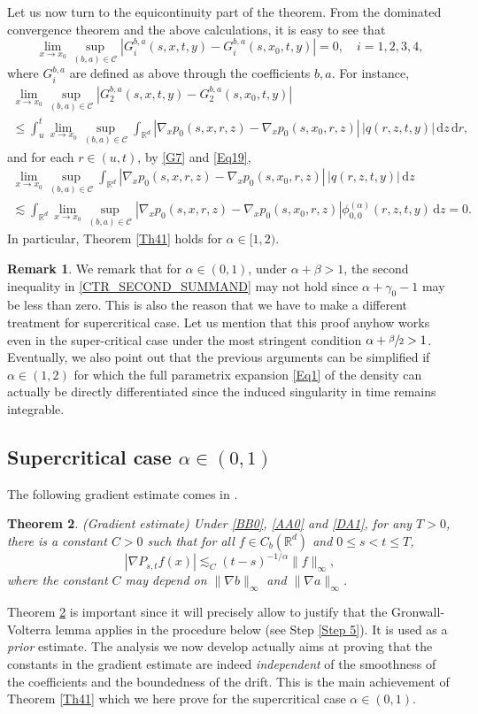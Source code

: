\documentclass[11pt]{article}
\numberwithin{equation}{section}\providecommand{\asymp}{\mathrel{\sim}}
\theoremstyle{plain}
\newtheorem{theorem}{Theorem}[section]
\theoremstyle{definition}
\newtheorem{remark}[theorem]{Remark}
\newcommand\mR{\mathbb{R}}
\newcommand\1{{\mathbf{1}}}
\newcommand\sC{{\mathscr C}}
\newcommand{\dif}{\,\mathrm{d}}
\begin{document}
{Let us now turn to the equicontinuity part of the theorem. From}
the dominated convergence theorem {and} the above calculations,
it is easy to see that
\[
\lim_{x\to x_0}\sup_{(b,a)\in\sC}|G_i^{b,a}(s,x,t,y)-G_i^{b,a}(s,x_0,t,y)|=0,\quad i=1,2,3,4,
\]
where $G_i^{b,a}$ are defined as above through the coefficients $b,a$. For instance,
\begin{multline*}
\lim_{x\to x_0}\sup_{(b,a)\in\sC}|G_2^{b,a}(s,x,t,y)-G_2^{b,a}(s,x_0,t,y)|\\
\leq\int_{u}^{t}\lim_{x\to x_0} \sup_{(b,a)\in\sC}\int_{\mR^d}|\nabla_x {p}_0(s,x,r,z)-\nabla_x {p}_0(s,x_0,r,z)|\,|q(r,z,t,y)|\dif z \dif r,
\end{multline*}
and for each $r\in(u,t)$, by \eqref{G7} and \eqref{Eq19},
\begin{multline*}
\lim_{x\to x_0} \sup_{(b,a)\in\sC}\int_{\mR^d}|\nabla_x {p}_0(s,x,r,z)-\nabla_x {p}_0(s,x_0,r,z)|\,|q(r,z,t,y)|\dif z\\
\lesssim\int_{\mR^d}\lim_{x\to x_0} \sup_{(b,a)\in\sC}|\nabla_x {p}_0(s,x,r,z)-\nabla_x {p}_0(s,x_0,r,z)|\phi^{(\alpha)}_{0,0}(r,z,t,y)\dif z=0.
\end{multline*}
In particular, Theorem \ref{Th41} holds for $\alpha\in[1,2)$.
\begin{remark}
We remark that for $\alpha\in(0,1)$, under $\alpha+\beta>1$, the second inequality in \eqref{CTR_SECOND_SUMMAND}
may not hold since $\alpha+\gamma_0-1$ may be less than zero.
This is also the reason that we have to make a different treatment for supercritical case.
Let us mention that this proof anyhow works even in the super-critical case under the most stringent condition $\alpha+\sfrac \beta 2>1 $. Eventually, we also point out that the previous arguments can be simplified if $\alpha\in (1,2)$ for which the full parametrix expansion \eqref{Eq1} of the density can actually be directly differentiated since the induced singularity in time remains integrable.
\end{remark}
\subsection{Supercritical case $\alpha\in(0,1)$}
The following gradient estimate comes in \cite{Wa-Xu-Zh}.
\begin{theorem}\label{Le36}
(Gradient estimate) Under \eqref{BB0}, \eqref{AA0} and \eqref{DA1},
for any $T>0$,
there is a constant $C>0$ such that
for all $f\in C_b(\mR^d)$
and $0\leq s<t\leq T$,
\[
|\nabla P_{s,t}f(x)|\lesssim_C (t-s)^{-1/\alpha}\|f\|_\infty,
\]
where the constant $C$ may depend on $\|\nabla b\|_\infty$ and $\|\nabla a\|_\infty$.
\end{theorem}
{Theorem \ref{Le36} is important since it will precisely allow to justify that the Gronwall-Volterra lemma applies in the procedure below (see Step \ref{Step 5}). It is used as a \textit{prior} estimate. The analysis we now develop actually aims at proving that the constants in the gradient estimate are indeed \emph{independent} of the smoothness of the coefficients {and the boundedness of the drift}. This is the main achievement of Theorem \ref{Th41} which we here prove for the supercritical case $\alpha\in (0,1) $}.
\end{document}

